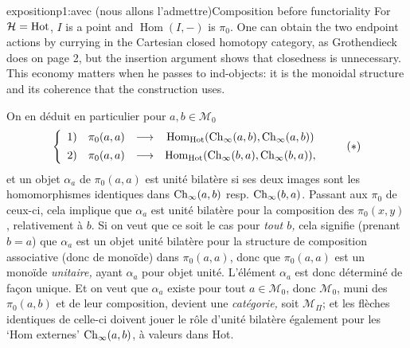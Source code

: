 \begin{dcomment}{exposition}{p1:avec (nous allons l'admettre)}{Composition before functoriality}
For $\mathcal H=\mathrm{Hot}$, $I$ is a point and $\operatorname{Hom}(I,-)$ is $\pi_0$. One can obtain the two endpoint actions by currying in the Cartesian closed homotopy category, as Grothendieck does on page 2, but the insertion argument shows that closedness is unnecessary. This economy matters when he passes to ind-objects: it is the monoidal structure and its coherence that the construction uses.
\end{dcomment}


On en déduit en particulier pour $a,b \in \mathcal{M}_0$
\[
\left\{
\begin{array}{cccc}
1) & \pi_0(a,a) & \longrightarrow & \mathrm{Hom}_{\mathrm{Hot}}(\mathrm{Ch}_\infty(a,b),\mathrm{Ch}_\infty(a,b)) \\[1ex]
2) & \pi_0(a,a) & \longrightarrow & \mathrm{Hom}_{\mathrm{Hot}}(\mathrm{Ch}_\infty(b,a),\mathrm{Ch}_\infty(b,a)),
\end{array}
\right.
\tag*{$(*)$}
\]
et un objet $\alpha_a$ de $\pi_0(a,a)$ est unité bilatère si ses deux images sont les homomorphismes identiques dans $\mathrm{Ch}_\infty(a,b)$ resp. $\mathrm{Ch}_\infty(b,a)$. Passant aux $\pi_0$ de ceux-ci, cela implique que $\alpha_a$ est unité bilatère pour la composition des $\pi_0(x,y)$, relativement à $b$. Si on veut que ce soit le cas pour \textit{tout $b$,} cela signifie (prenant $b = a$) que $\alpha_a$ est un objet unité bilatère pour la structure de composition associative (donc de monoïde) dans $\pi_0(a,a)$, donc que $\pi_0(a,a)$ est un monoïde \textit{unitaire,} ayant $\alpha_a$ pour objet unité. L'élément $\alpha_a$ est donc déterminé de façon unique. Et on veut que $\alpha_a$ existe
pour tout $a \in \mathcal{M}_0$, donc $\mathcal{M}_0$, muni des $\pi_0(a,b)$ et de leur composition, devient une \textit{catégorie,} soit $\mathcal{M}_\Pi$; et les flèches identiques de celle-ci doivent jouer le rôle d'unité bilatère également pour les `Hom externes' $\mathrm{Ch}_\infty(a,b)$, à valeurs dans Hot.

